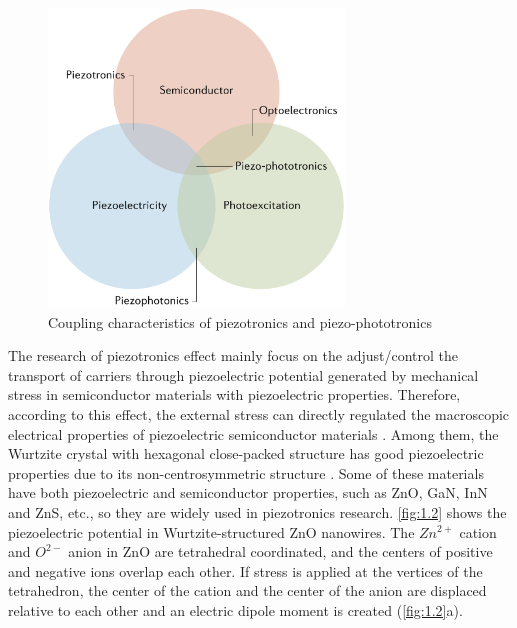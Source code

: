 \begin{figure}[H] 
\centering    
\includegraphics[width=0.7\textwidth]{ch1_1}
\caption[Coupling characteristics of piezotronics and piezo-phototronics]{Coupling characteristics of piezotronics and piezo-phototronics \protect\cite{wu2016piezotronics}}
\label{fig:1.1}
\end{figure}

The research of piezotronics  effect mainly focus on the adjust/control the transport of carriers through piezoelectric potential  generated by mechanical stress in semiconductor materials with piezoelectric  properties. Therefore, according to this effect, the external stress can directly regulated the macroscopic electrical properties of piezoelectric semiconductor materials \cite{guo2017dynamic}. Among them, the Wurtzite  crystal  with hexagonal close-packed structure has good piezoelectric properties due to its non-centrosymmetric structure \cite{xin2007piezoelectricity}. Some of these materials have both piezoelectric and semiconductor properties, such as ZnO, GaN, InN and ZnS, etc., so they are widely used in piezotronics research. \autoref{fig:1.2} shows the piezoelectric potential in Wurtzite-structured ZnO nanowires. The $Zn^{2+}$ cation and $O^{2-}$ anion in ZnO are tetrahedral coordinated, and the centers of positive and negative ions overlap each other. If stress is applied at the vertices of the tetrahedron, the center of the cation and the center of the anion are displaced relative to each other and an electric dipole moment  is created (\autoref{fig:1.2}a). 

